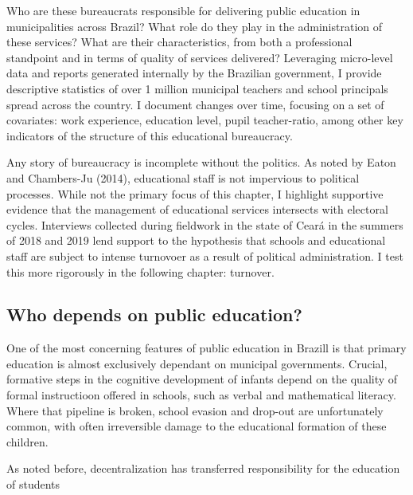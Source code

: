 \documentclass[12pt,]{article}
\begin{document}
Who are these bureaucrats responsible for delivering public education in
municipalities across Brazil? What role do they play in the
administration of these services? What are their characteristics, from
both a professional standpoint and in terms of quality of services
delivered? Leveraging micro-level data and reports generated internally
by the Brazilian government, I provide descriptive statistics of over 1
million municipal teachers and school principals spread across the
country. I document changes over time, focusing on a set of covariates:
work experience, education level, pupil teacher-ratio, among other key
indicators of the structure of this educational bureaucracy.

Any story of bureaucracy is incomplete without the politics. As noted by
Eaton and Chambers-Ju (2014), educational staff is not impervious to
political processes. While not the primary focus of this chapter, I
highlight supportive evidence that the management of educational
services intersects with electoral cycles. Interviews collected during
fieldwork in the state of Ceará in the summers of 2018 and 2019 lend
support to the hypothesis that schools and educational staff are subject
to intense turnovoer as a result of political administration. I test
this more rigorously in the following chapter: turnover.

\hypertarget{who-depends-on-public-education}{%
\subsection{Who depends on public
education?}\label{who-depends-on-public-education}}

One of the most concerning features of public education in Brazill is
that primary education is almost exclusively dependant on municipal
governments. Crucial, formative steps in the cognitive development of
infants depend on the quality of formal instructioon offered in schools,
such as verbal and mathematical literacy. Where that pipeline is broken,
school evasion and drop-out are unfortunately common, with often
irreversible damage to the educational formation of these children.

As noted before, decentralization has transferred responsibility for the
education of students
\end{document}
